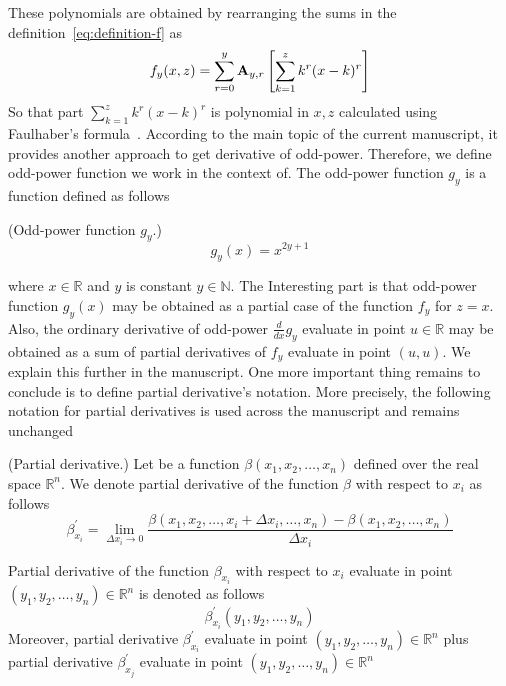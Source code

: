 These polynomials are obtained by rearranging the sums in the definition~\eqref{eq:definition-f} as
\[
    f_{y} (x, z) = \sum_{r=0}^{y} {\mathbf{A}} \sb{y,r} \left[ \sum_{k=1}^{z} k^r (x-k)^r \right]
\]
So that part $\sum_{k=1}^{z} k^r (x-k)^r$ is polynomial
in $x, z$ calculated using Faulhaber's formula~\cite{beardon1996sums}.
According to the main topic of the current manuscript, it provides another approach to get derivative of odd-power.
Therefore, we define odd-power function we work in the context of.
The odd-power function $g_y$ is a function defined as follows
\begin{definition}(Odd-power function $g_y$.)
    \begin{equation*}
        g_{y}(x) = x^{2y + 1}
    \end{equation*}
\end{definition}
where $x\in \mathbb{R}$ and $y$ is constant $y\in \mathbb{N}$.
The Interesting part is that odd-power function $g_{y} (x)$ may be obtained
as a partial case of the function $f_y$ for $z=x$.
Also, the ordinary derivative of odd-power $\frac{d}{dx} g_{y}$ evaluate in point $u\in\mathbb{R}$
may be obtained as a sum of partial derivatives of $f_y$ evaluate in point $(u,u)$.
We explain this further in the manuscript.
One more important thing remains to conclude is to define partial derivative's notation.
More precisely, the following notation for partial derivatives
is used across the manuscript and remains unchanged
\begin{notation} (Partial derivative.)
    Let be a function $\beta (x_1, x_2, \dots, x_n)$ defined over the real space $\mathbb{R}^n$.
    We denote partial derivative of the function $\beta$ with respect to $x_i$ as follows
    \begin{equation*}
        \beta^{'}_{x_i}
        = \lim_{\Delta x_i \to 0}
        \frac{\beta (x_1, x_2, \dots, x_i + \Delta x_i, \dots, x_n) - \beta (x_1, x_2, \dots, x_n)}{\Delta x_i}
    \end{equation*}
\end{notation}
Partial derivative of the function $\beta_{x_i}$ with respect to $x_i$
evaluate in point $(y_1, y_2, \dots, y_n) \in \mathbb{R}^n$ is denoted as follows
\begin{equation*}
    \beta^{'}_{x_i} (y_1, y_2, \dots, y_n)
\end{equation*}
Moreover, partial derivative $\beta^{'}_{x_i}$ evaluate in point $(y_1, y_2, \dots, y_n) \in \mathbb{R}^n$ plus
partial derivative $\beta^{'}_{x_j}$ evaluate in point $(y_1, y_2, \dots, y_n) \in \mathbb{R}^n$
